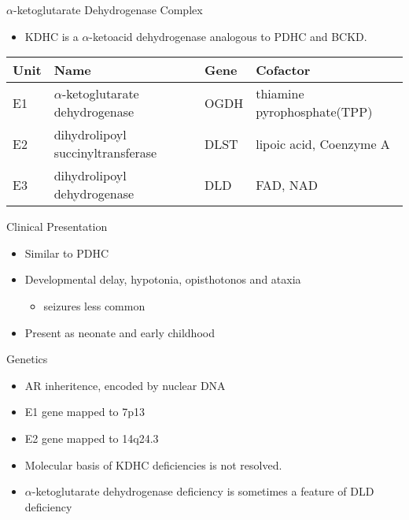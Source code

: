 \documentclass[presentation, smaller]{beamer}
\begin{document}
\begin{frame}[label={sec:orge6c1b13}]{\(\alpha\)-ketoglutarate Dehydrogenase Complex}
\begin{itemize}
\item KDHC is a \(\alpha\)-ketoacid dehydrogenase analogous to PDHC and BCKD.
\end{itemize}



\begin{center}
\begin{tabular}{llll}
Unit & Name & Gene & Cofactor\\
\hline
E1 & \(\alpha\)-ketoglutarate dehydrogenase & OGDH & thiamine pyrophosphate(TPP)\\
E2 & dihydrolipoyl succinyltransferase & DLST & lipoic acid, Coenzyme A\\
E3 & dihydrolipoyl dehydrogenase & DLD & FAD, NAD\\
\end{tabular}
\end{center}
\end{frame}

\begin{frame}[label={sec:org357bfd7}]{Clinical Presentation}
\begin{itemize}
\item Similar to PDHC
\item Developmental delay, hypotonia, opisthotonos and ataxia
\begin{itemize}
\item seizures less common
\end{itemize}
\item Present as neonate and early childhood
\end{itemize}
\end{frame}

\begin{frame}[label={sec:org8fd7069}]{Genetics}
\begin{itemize}
\item AR inheritence, encoded by nuclear DNA
\item E1 gene mapped to 7p13
\item E2 gene mapped to 14q24.3
\item Molecular basis of KDHC deficiencies is not resolved.

\item \(\alpha\)-ketoglutarate dehydrogenase deficiency is sometimes a feature of DLD deficiency
\end{itemize}
\end{frame}
\end{document}
